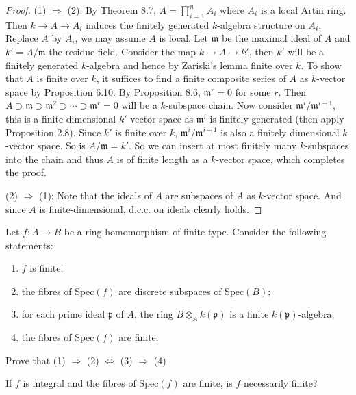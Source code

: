 \documentclass{solution}
\begin{document}
\begin{proof}
    (1) $\Rightarrow$ (2): By Theorem 8.7, $A = \prod\limits_{i = 1}^{n} A_i$ where $A_i$ is a local Artin ring. Then $k \rightarrow A \rightarrow A_i$ induces the finitely generated $k$-algebra structure on $A_i$. Replace $A$ by $A_i$, we may assume $A$ is local. Let $\mathfrak{m}$ be the maximal ideal of $A$ and $k' = A / \mathfrak{m}$ the residue field. Consider the map $k \rightarrow A \rightarrow k'$, then $k'$ will be a finitely generated $k$-algebra and hence by Zariski's lemma finite over $k$. To show that $A$ is finite over $k$, it suffices to find a finite composite series of $A$ as $k$-vector space by Proposition 6.10. By Proposition 8.6, $\mathfrak{m}^r = 0$ for some $r$. Then $A \supset \mathfrak{m} \supset \mathfrak{m}^2 \supset \cdots \supset \mathfrak{m}^r = 0$ will be a $k$-subspace chain. Now consider $\mathfrak{m}^i / \mathfrak{m}^{i + 1}$, this is a finite dimensional $k'$-vector space as $\mathfrak{m}^i$ is finitely generated (then apply Proposition 2.8). Since $k'$ is finite over $k$, $\mathfrak{m}^{i} / \mathfrak{m}^{i + 1}$ is also a finitely dimensional $k$-vector space. So is $A / \mathfrak{m} = k'$. So we can insert at most finitely many $k$-subspaces into the chain and thus $A$ is of finite length as a $k$-vector space, which completes the proof.

    (2) $\Rightarrow$ (1): Note that the ideals of $A$ are subspaces of $A$ as $k$-vector space. And since $A$ is finite-dimensional, d.c.c. on ideals clearly holds.
\end{proof}

\begin{problem}
    Let $f: A \rightarrow B$ be a ring homomorphism of finite type. Consider the following statements:
    \begin{enumerate}
        \item $f$ is finite;
        \item the fibres of $\mathrm{Spec}(f)$ are discrete subspaces of $\mathrm{Spec}(B)$;
        \item for each prime ideal $\mathfrak{p}$ of $A$, the ring $B \otimes_A k(\mathfrak{p})$ is a finite $k(\mathfrak{p})$-algebra;
        \item the fibres of $\mathrm{Spec}(f)$ are finite.
    \end{enumerate}
    Prove that (1) $\Rightarrow$ (2) $\Leftrightarrow$ (3) $\Rightarrow$ (4)

    If $f$ is integral and the fibres of $\mathrm{Spec}(f)$ are finite, is $f$ necessarily finite?
\end{problem}
\end{document}

